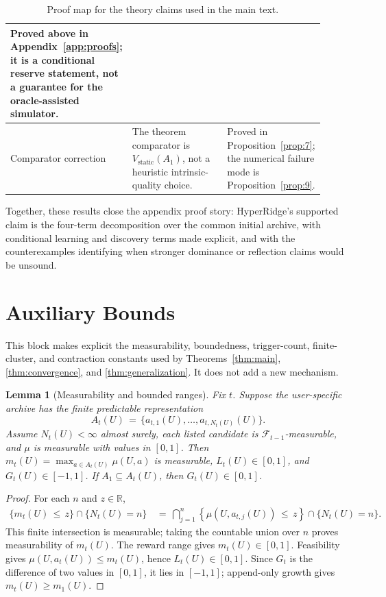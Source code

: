 \documentclass{article} %
\newtheorem{lemma}[theorem]{Lemma}
\begin{document}
\begin{table}[h]
\begin{tabular}{p{0.24\linewidth}p{0.39\linewidth}p{0.28\linewidth}}
Proved above in Appendix~\ref{app:proofs}; it is a conditional reserve statement, not a guarantee for the oracle-assisted simulator. \\
\midrule
Comparator correction &
The theorem comparator is \(V_{\mathrm{static}}(A_1)\), not a heuristic intrinsic-quality choice. &
Proved in Proposition~\ref{prop:7}; the numerical failure mode is Proposition~\ref{prop:9}. \\
\bottomrule
\end{tabular}
\caption{Proof map for the theory claims used in the main text.}
\label{tab:app-claim-map}
\end{table}

Together, these results close the appendix proof story: HyperRidge's supported claim is the four-term decomposition over the common initial archive, with conditional learning and discovery terms made explicit, and with the counterexamples identifying when stronger dominance or reflection claims would be unsound.

\section{Auxiliary Bounds}

\label{app:proofs-extra}

This block makes explicit the measurability, boundedness, trigger-count,
finite-cluster, and contraction constants used by
Theorems~\ref{thm:main}, \ref{thm:convergence}, and
\ref{thm:generalization}. It does not add a new mechanism.

\begin{lemma}[Measurability and bounded ranges]
\label{lem:measurable-bounded-ranges}
Fix \(t\).  Suppose the user-specific archive has the finite predictable
representation
\begin{equation}
A_t(U)
\,=\,
\{a_{t,1}(U),\ldots,a_{t,N_t(U)}(U)\}.
\end{equation}
Assume \(N_t(U)<\infty\) almost surely, each listed candidate is
\(\mathcal F_{t-1}\)-measurable, and \(\mu\) is measurable with values in
\([0,1]\).  Then \(m_t(U)=\max_{a\in A_t(U)}\mu(U,a)\) is measurable,
\(L_t(U)\in[0,1]\), and \(G_t(U)\in[-1,1]\).  If
\(A_1\subseteq A_t(U)\), then \(G_t(U)\in[0,1]\).
\end{lemma}

\begin{proof}
For each \(n\) and \(z\in\mathbb R\),
\begin{equation}
\begin{aligned}
\{m_t(U)\,\le\, z\}\cap\{N_t(U)=n\}
&\,=\,
\bigcap_{j=1}^{n}
\left\{
\mu\!\left(U,a_{t,j}(U)\right)\,\le\, z
\right\}
\cap
\{N_t(U)=n\}.
\end{aligned}
\end{equation}
This finite intersection is measurable; taking the countable union over
\(n\) proves measurability of \(m_t(U)\).  The reward range gives
\(m_t(U)\in[0,1]\).  Feasibility gives
\(\mu(U,a_t(U))\leq m_t(U)\), hence \(L_t(U)\in[0,1]\).  Since \(G_t\) is the
difference of two values in \([0,1]\), it lies in \([-1,1]\); append-only
growth gives \(m_t(U)\geq m_1(U)\).
\end{proof}
\end{document}
